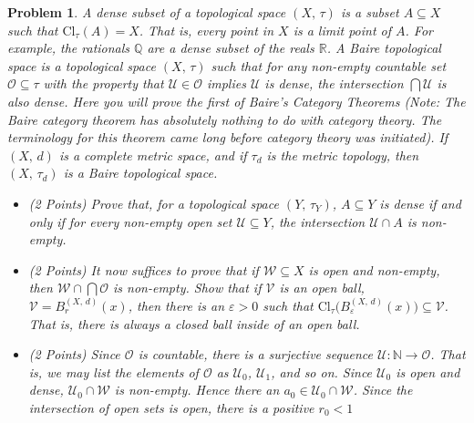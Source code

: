 \documentclass{article}
\theoremstyle{normal}
\newtheorem{problem}{Problem}
\begin{document}
    \clearpage
    \color{blue}
    \begin{problem}
        A dense subset of a topological space $(X,\,\tau)$ is a subset
        $A\subseteq{X}$ such that $\textrm{Cl}_{\tau}(A)=X$. That is, every
        point in $X$ is a limit point of $A$. For example, the rationals
        $\mathbb{Q}$ are a dense subset of the reals $\mathbb{R}$.
        A Baire topological space is a topological space $(X,\,\tau)$ such that
        for any non-empty countable set $\mathcal{O}\subseteq\tau$ with the
        property that $\mathcal{U}\in\mathcal{O}$ implies $\mathcal{U}$ is
        dense, the intersection $\bigcap\mathcal{U}$ is also dense. Here you
        will prove the first of Baire's Category Theorems (Note: The Baire
        category theorem has absolutely nothing to do with category theory.
        The terminology for this theorem came long before category theory was
        initiated). If $(X,\,d)$ is a complete metric space, and if
        $\tau_{d}$ is the metric topology, then $(X,\,\tau_{d})$ is a Baire
        topological space.
        \begin{itemize}
            \item (2 Points) Prove that, for a topological space
                $(Y,\,\tau_{Y})$, $A\subseteq{Y}$ is dense if and only if
                for every non-empty open set $\mathcal{U}\subseteq{Y}$, the
                intersection $\mathcal{U}\cap{A}$ is non-empty.
            \item (2 Points) It now suffices to prove that if
                $\mathcal{W}\subseteq{X}$ is open and non-empty, then
                $\mathcal{W}\cap\bigcap\mathcal{O}$ is non-empty. Show that if
                $\mathcal{V}$ is an open ball,
                $\mathcal{V}=B_{r}^{(X,\,d)}(x)$, then there is an
                $\varepsilon>0$ such that
                $\textrm{Cl}_{\tau}\big(B_{\varepsilon}^{(X,\,d)}(x)\big)\subseteq\mathcal{V}$.
                That is, there is always a \textit{closed ball} inside of an
                open ball.
            \item (2 Points) Since $\mathcal{O}$ is countable, there is a surjective
                sequence $\mathcal{U}:\mathbb{N}\rightarrow\mathcal{O}$. That
                is, we may list the elements of $\mathcal{O}$ as $\mathcal{U}_{0}$,
                $\mathcal{U}_{1}$, and so on. Since $\mathcal{U}_{0}$ is open
                and dense, $\mathcal{U}_{0}\cap\mathcal{W}$ is non-empty. Hence
                there an $a_{0}\in\mathcal{U}_{0}\cap\mathcal{W}$. Since the
                intersection of open sets is open, there is a positive $r_{0}<1$

\end{itemize}
\end{problem}
\end{document}
